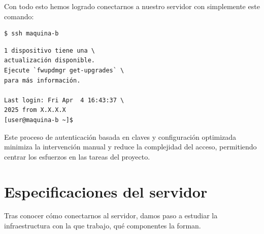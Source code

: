 \begin{minipage}[t]{0.48\textwidth} 
    Con todo esto hemos logrado conectarnos a nuestro servidor con simplemente este comando:

    \begin{center}
    \begin{minipage}{0.95\linewidth}
    \begin{verbatim}
$ ssh maquina-b
    \end{verbatim}
    \end{minipage}
    \end{center}
    
    \begin{center}
       \begin{minipage}{0.95\linewidth}
       \small
       \begin{verbatim}
1 dispositivo tiene una \
actualización disponible.
Ejecute `fwupdmgr get-upgrades` \
para más información.
       
Last login: Fri Apr  4 16:43:37 \
2025 from X.X.X.X
[user@maquina-b ~]$
       \end{verbatim}
       \end{minipage}
       \end{center}
    
    Este proceso de autenticación basada en claves y configuración optimizada minimiza la intervención manual y reduce la complejidad del acceso, permitiendo centrar los esfuerzos en las tareas del proyecto.
    
    \section{Especificaciones del servidor}
    
    Tras conocer cómo conectarnos al servidor, damos paso a estudiar la infraestructura con la que trabajo, qué componentes la forman. 
    

\end{minipage}%
\hfill 

